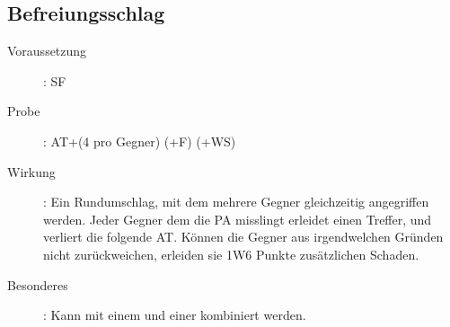 \subsection{Befreiungsschlag}
\label{aktion.befreiungsschlag}
\begin{description}
    \item[Voraussetzung]:
        SF 
    \item[Probe]:
        AT+(4 pro Gegner) (+F) (+WS)
    \item[Wirkung]:
        Ein Rundumschlag, mit dem mehrere Gegner gleichzeitig angegriffen werden.
        Jeder Gegner dem die PA misslingt erleidet einen Treffer, und verliert die folgende AT.
        Können die Gegner aus irgendwelchen Gründen nicht zurückweichen, erleiden sie 1W6 Punkte zusätzlichen Schaden.
    \item[Besonderes]:
        Kann mit einem  und einer  kombiniert werden.
\end{description}
